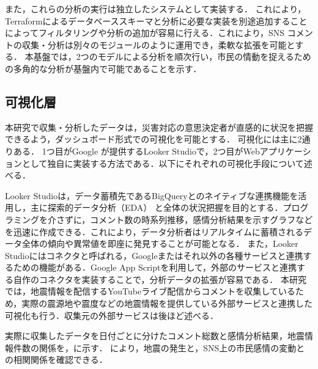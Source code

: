 
  また，これらの分析の実行は独立したシステムとして実装する．
  これにより，Terraformによるデータベーススキーマと分析に必要な実装を別途追加することによってフィルタリングや分析の追加が容易に行える．これにより，SNS コメントの収集・分析は別々のモジュールのように運用でき，柔軟な拡張を可能とする．
  本基盤では，2つのモデルによる分析を順次行い，市民の情動を捉えるための多角的な分析が基盤内で可能であることを示す．

  \subsection{可視化層}
  \label{sec:visualization_layer}

  本研究で収集・分析したデータは，災害対応の意思決定者が直感的に状況を把握できるよう，ダッシュボード形式での可視化を可能とする．
  可視化には主に2通りある．
  1つ目がGoogle が提供するLooker Studioで，2つ目がWebアプリケーションとして独自に実装する方法である．以下にそれぞれの可視化手段について述べる．
  
  Looker Studioは，データ蓄積先であるBigQueryとのネイティブな連携機能を活用し，主に探索的データ分析（EDA）\cite{agarwal2024eda_banking} と全体の状況把握を目的とする．プログラミングを介さずに，コメント数の時系列推移，感情分析結果を示すグラフなどを迅速に作成できる．これにより，データ分析者はリアルタイムに蓄積されるデータ全体の傾向や異常値を即座に発見することが可能となる．
  また，Looker Studioにはコネクタと呼ばれる，Googleまたはそれ以外の各種サービスと連携するための機能がある．Google App Scriptを利用して，外部のサービスと連携する自作のコネクタを実装することで，分析データの拡張が容易である．
  本研究では，地震情報を配信するYouTubeライブ配信からコメントを収集しているため，実際の震源地や震度などの地震情報を提供している外部サービスと連携した可視化も行う．収集元の外部サービスは後ほど述べる．


  実際に収集したデータを日付ごとに分けたコメント総数と感情分析結果，地震情報件数の関係を，に示す．
  により，地震の発生と，SNS上の市民感情の変動との相関関係を確認できる．
  
  \clearpage
  
  
